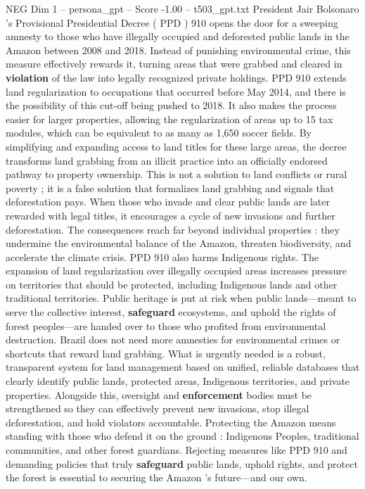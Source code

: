 \begin{textsample}{NEG Dim 1 – persona\_gpt – Score -1.00 – t503\_gpt.txt}  \label{ex:f1_neg_033}
President Jair Bolsonaro ’s Provisional Presidential Decree ( PPD ) 910 opens the door for a sweeping amnesty to those who have illegally occupied and deforested public lands in the Amazon between 2008 and 2018.
Instead of punishing environmental crime, this measure effectively rewards it, turning areas that were grabbed and cleared in \textbf{violation} of the law into legally recognized private holdings.
PPD 910 extends land regularization to occupations that occurred before May 2014, and there is the possibility of this cut-off being pushed to 2018.
It also makes the process easier for larger properties, allowing the regularization of areas up to 15 tax modules, which can be equivalent to as many as 1,650 soccer fields.
By simplifying and expanding access to land titles for these large areas, the decree transforms land grabbing from an illicit practice into an officially endorsed pathway to property ownership.
This is not a solution to land conflicts or rural poverty ; it is a false solution that formalizes land grabbing and signals that deforestation pays.
When those who invade and clear public lands are later rewarded with legal titles, it encourages a cycle of new invasions and further deforestation.
The consequences reach far beyond individual properties : they undermine the environmental balance of the Amazon, threaten biodiversity, and accelerate the climate crisis.
PPD 910 also harms Indigenous rights.
The expansion of land regularization over illegally occupied areas increases pressure on territories that should be protected, including Indigenous lands and other traditional territories.
Public heritage is put at risk when public lands—meant to serve the collective interest, \textbf{safeguard} ecosystems, and uphold the rights of forest peoples—are handed over to those who profited from environmental destruction.
Brazil does not need more amnesties for environmental crimes or shortcuts that reward land grabbing.
What is urgently needed is a robust, transparent system for land management based on unified, reliable databases that clearly identify public lands, protected areas, Indigenous territories, and private properties.
Alongside this, oversight and \textbf{enforcement} bodies must be strengthened so they can effectively prevent new invasions, stop illegal deforestation, and hold violators accountable.
Protecting the Amazon means standing with those who defend it on the ground : Indigenous Peoples, traditional communities, and other forest guardians.
Rejecting measures like PPD 910 and demanding policies that truly \textbf{safeguard} public lands, uphold rights, and protect the forest is essential to securing the Amazon ’s future—and our own.

\end{textsample}
